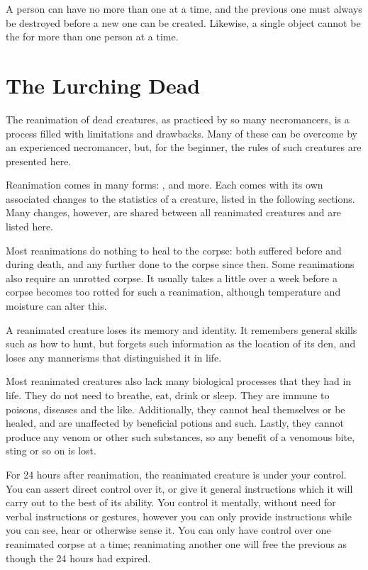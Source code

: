 A person can have no more than one \phylactery at a time, and the previous one must always be destroyed before a new one can be created.
Likewise, a single object cannot be the \phylactery for more than one person at a time.

\section{The Lurching Dead}

The reanimation of dead creatures, as practiced by so many necromancers, is a process filled with limitations and drawbacks.
Many of these can be overcome by an experienced necromancer, but, for the beginner, the rules of such creatures are presented here.

Reanimation comes in many forms: ,  and more.
Each comes with its own associated changes to the statistics of a creature, listed in the following sections.
Many changes, however, are shared between all reanimated creatures and are listed here.

Most reanimations do nothing to heal {\damage} to the corpse: both {\damage} suffered before and during death, and any further {\damage} done to the corpse since then.
Some reanimations also require an unrotted corpse.
It usually takes a little over a week before a corpse becomes too rotted for such a reanimation, although temperature and moisture can alter this.

A reanimated creature loses its memory and identity.
It remembers general skills such as how to hunt, but forgets such information as the location of its den, and loses any mannerisms that distinguished it in life.

Most reanimated creatures also lack many biological processes that they had in life.
They do not need to breathe, eat, drink or sleep.
They are immune to poisons, diseases and the like.
Additionally, they cannot heal themselves or be healed, and are unaffected by beneficial potions and such.
Lastly, they cannot produce any venom or other such substances, so any benefit of a venomous bite, sting or so on is lost.

For 24 hours after reanimation, the reanimated creature is under your control.
You can assert direct control over it, or give it general instructions which it will carry out to the best of its ability.
You control it mentally, without need for verbal instructions or gestures, however you can only provide instructions while you can see, hear or otherwise sense it.
You can only have control over one reanimated corpse at a time; reanimating another one will free the previous as though the 24 hours had expired.


